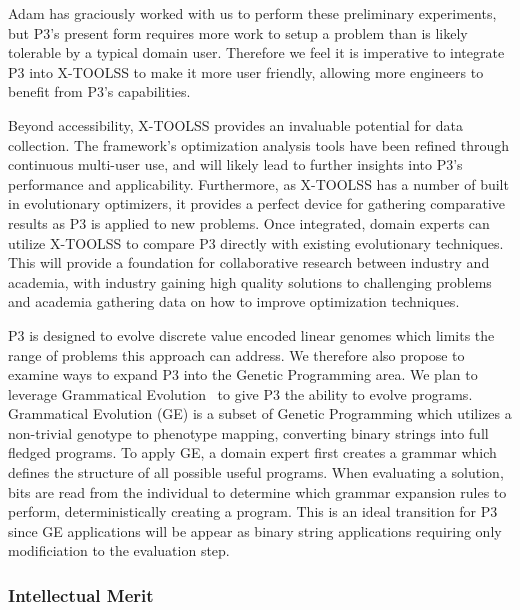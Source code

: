 \documentclass{article}
\newcommand{\includegraphicsfit}[1]
{\texttt{[image: \#1]}}
\begin{document}
Adam has graciously worked with us to perform these preliminary
experiments, but P3's present form requires more work to setup a
problem than is likely tolerable by a typical domain user. 
Therefore we feel it is imperative to integrate P3 into X-TOOLSS to make it more user friendly,
allowing more engineers to benefit from P3's capabilities.

Beyond accessibility, X-TOOLSS provides an invaluable potential for data collection.
The framework's optimization analysis tools have been refined through continuous multi-user use, and
will likely lead to further insights into P3's performance and applicability.  Furthermore, as X-TOOLSS has a number
of built in evolutionary optimizers, it provides a perfect device for gathering comparative results
as P3 is applied to new problems.  Once integrated, domain experts can utilize
X-TOOLSS to compare P3 directly with existing evolutionary techniques.
This will provide a foundation
for collaborative research between industry and academia, with industry gaining high quality solutions
to challenging problems and academia gathering data on how to improve optimization techniques.


P3 is designed to evolve discrete value encoded linear
genomes which limits the range of problems this approach can address.
We therefore also propose to examine ways to expand P3 into the
Genetic Programming area. We plan to leverage Grammatical Evolution~\cite{oneill:2001:grammatical}
to give P3 the ability to evolve programs.  Grammatical Evolution (GE) is a subset
of Genetic Programming which utilizes a non-trivial genotype to phenotype mapping, converting
binary strings into full fledged programs.  To apply GE, a domain expert first creates a
grammar which defines the structure of all possible useful programs.  When evaluating a
solution, bits are read from the individual to determine which grammar expansion rules to perform,
deterministically creating a program.  This is an ideal transition for
P3 since GE applications will be appear as binary string
applications requiring 
only modificiation to the evaluation step.

\vspace{-2.5mm}
\subsubsection*{Intellectual Merit}
\end{document}
